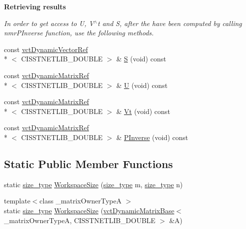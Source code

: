 \begin{Indent}{\bf Retrieving results}\par
{\em In order to get access to U, V$^\wedge$t and S, after the have been computed by calling nmr\-P\-Inverse function, use the following methods. }\begin{DoxyCompactItemize}
\item 
const \hyperlink{classvct_dynamic_vector_ref}{vct\-Dynamic\-Vector\-Ref}\\*
$<$ C\-I\-S\-S\-T\-N\-E\-T\-L\-I\-B\-\_\-\-D\-O\-U\-B\-L\-E $>$ \& \hyperlink{classnmr_p_inverse_dynamic_data_a81ff6cbc57fd0aba046c10665396034e}{S} (void) const 
\item 
const \hyperlink{classvct_dynamic_matrix_ref}{vct\-Dynamic\-Matrix\-Ref}\\*
$<$ C\-I\-S\-S\-T\-N\-E\-T\-L\-I\-B\-\_\-\-D\-O\-U\-B\-L\-E $>$ \& \hyperlink{classnmr_p_inverse_dynamic_data_a3032d3c852dd54592fcea9de965355a6}{U} (void) const 
\item 
const \hyperlink{classvct_dynamic_matrix_ref}{vct\-Dynamic\-Matrix\-Ref}\\*
$<$ C\-I\-S\-S\-T\-N\-E\-T\-L\-I\-B\-\_\-\-D\-O\-U\-B\-L\-E $>$ \& \hyperlink{classnmr_p_inverse_dynamic_data_ade82fb68e98523f912f146e69902aba9}{Vt} (void) const 
\item 
const \hyperlink{classvct_dynamic_matrix_ref}{vct\-Dynamic\-Matrix\-Ref}\\*
$<$ C\-I\-S\-S\-T\-N\-E\-T\-L\-I\-B\-\_\-\-D\-O\-U\-B\-L\-E $>$ \& \hyperlink{classnmr_p_inverse_dynamic_data_a456296fc2182819e99d210d093cfc0a4}{P\-Inverse} (void) const 
\end{DoxyCompactItemize}
\end{Indent}
\subsection*{Static Public Member Functions}
\begin{DoxyCompactItemize}
\item 
static \hyperlink{classnmr_p_inverse_dynamic_data_a059041cc0fb800515bffe5bb351b01cb}{size\-\_\-type} \hyperlink{classnmr_p_inverse_dynamic_data_aee681485d8de68b460a65585fea10e68}{Workspace\-Size} (\hyperlink{classnmr_p_inverse_dynamic_data_a059041cc0fb800515bffe5bb351b01cb}{size\-\_\-type} m, \hyperlink{classnmr_p_inverse_dynamic_data_a059041cc0fb800515bffe5bb351b01cb}{size\-\_\-type} n)
\item 
{\footnotesize template$<$class \-\_\-matrix\-Owner\-Type\-A $>$ }\\static \hyperlink{classnmr_p_inverse_dynamic_data_a059041cc0fb800515bffe5bb351b01cb}{size\-\_\-type} \hyperlink{classnmr_p_inverse_dynamic_data_a98152d6fe4a6b4c7e0e7d32f04388f21}{Workspace\-Size} (\hyperlink{classvct_dynamic_matrix_base}{vct\-Dynamic\-Matrix\-Base}$<$ \-\_\-matrix\-Owner\-Type\-A, C\-I\-S\-S\-T\-N\-E\-T\-L\-I\-B\-\_\-\-D\-O\-U\-B\-L\-E $>$ \&A)
\end{DoxyCompactItemize}

